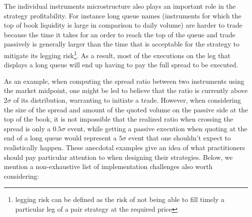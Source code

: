The individual instruments microstructure also plays an important role in the strategy profitability. For instance long queue names  (instruments for which the top of book liquidity is large in comparison to daily volume)  are harder to trade because the time it takes for an order to reach the top of the queue and trade passively is generally larger than the time that is acceptable for the strategy to mitigate its legging risk\footnote{legging risk can be defined as the risk of not being able to fill timely a particular leg of a pair strategy at the required price}. As a result, most of the executions on the leg that displays a long queue will end up having to pay the full spread to be executed. 


As an example, when computing the spread ratio between two instruments using the market midpoint, one might be led to believe that the ratio is currently above $2\sigma$ of its distribution, warranting to initiate a trade. However, when considering the size of the spread and amount of the quoted volume on the passive side at the top of the book, it is not impossible that the realized ratio when crossing the spread is only a $0.5\sigma$ event, while getting a passive execution when quoting at the end of a long queue would represent a $5\sigma$ event that one shouldn't expect to realistically happen. These anecdotal examples give an idea of what practitioners should pay particular attention to when designing their strategies. Below, we mention a non-exhaustive list of implementation challenges also worth considering:

